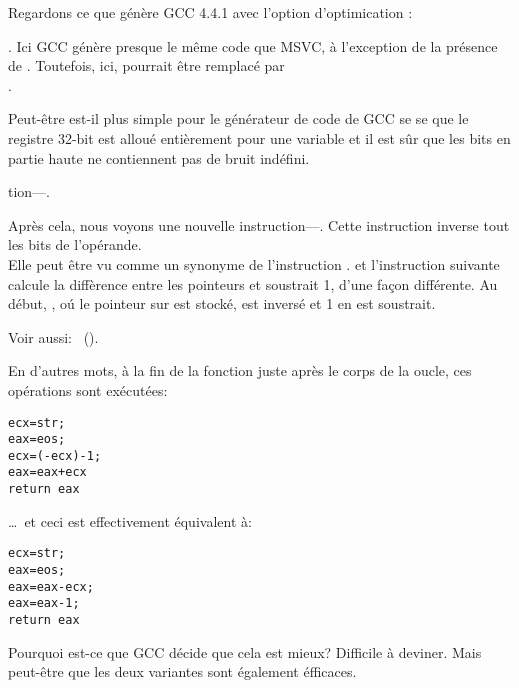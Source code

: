 


Regardons ce que génère GCC 4.4.1 avec l'option d'optimication \Othree:



.
Ici GCC génère presque le même code que MSVC, à l'exception de la présence de \MOVZX.
Toutefois, ici, \MOVZX pourrait être remplacé par\\
.

Peut-être est-il plus simple pour le générateur de code de GCC se se 
que le registre 32-bit \EDX est alloué entièrement pour une variable \Tchar et il
est sûr que les bits en partie haute ne contiennent pas de bruit indéfini.

\label{strlen_NOT_ADD}
tion---\NOT.

Après cela, nous voyons une nouvelle instruction---\NOT. Cette instruction inverse
tout les bits de l'opérande. \\
Elle peut être vu comme un synonyme de l'instruction .
\NOT et l'instruction suivante \ADD calcule la diffèrence entre les pointeurs et
soustrait 1, d'une façon différente.
Au début, \ECX, oú le pointeur sur  est stocké, est inversé et 1 en est soustrait.

Voir aussi: \q{\SignedNumbersSectionName}~().

En d'autres mots, à la fin de la fonction juste après le corps de la oucle, ces opérations
sont exécutées:

\begin{lstlisting}[style=customc]
ecx=str;
eax=eos;
ecx=(-ecx)-1;
eax=eax+ecx
return eax
\end{lstlisting}

\dots~et ceci est effectivement équivalent à:

\begin{lstlisting}[style=customc]
ecx=str;
eax=eos;
eax=eax-ecx;
eax=eax-1;
return eax
\end{lstlisting}

Pourquoi est-ce que GCC décide que cela est mieux? Difficile à deviner.
Mais peut-être que les deux variantes sont également éfficaces.

